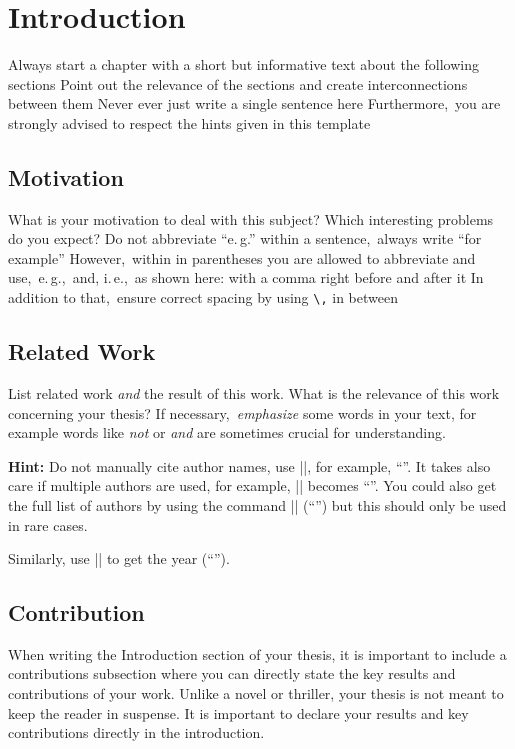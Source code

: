 \chapter{Introduction} \label{chap:intro}
Always start a chapter with a short but informative text about the following sections Point out the relevance of the sections and create interconnections between them Never ever just write a single sentence here Furthermore,\ you are strongly advised to respect the hints given in this template

\section{Motivation}
What is your motivation to deal with this subject? Which interesting problems do you expect? Do not abbreviate \enquote{e.\,g.\/} within a sentence,\ always write \enquote{for example} However,\ within in parentheses you are allowed to abbreviate and use,\ e.\,g.,\ and, i.\,e.,\ as shown here: with a comma right before and after it In addition to that,\ ensure correct spacing by using \texttt{\textbackslash,} in between

\section{Related Work}
List related work \emph{and} the result of this work. What is the relevance of this work concerning your thesis? If necessary,\ \emph{emphasize} some words in your text, for example words like \emph{not} or \emph{and} are sometimes crucial for understanding.

\textbf{Hint:} Do not manually cite author names, use \code|\citeauthor{Newsome:05:DTA}|, for example, \enquote{\citeauthor{Newsome:05:DTA}}.
It takes also care if multiple authors are used, for example, \code|\citeauthor{AviramSSHDSVAHD16}| becomes \enquote{\citeauthor{AviramSSHDSVAHD16}}.
You could also get the full list of authors by using the command \code|\citeauthor*{AviramSSHDSVAHD16}| (\enquote{\citeauthor*{AviramSSHDSVAHD16}}) but this should only be used in rare cases.

Similarly, use \code|\citeyear{Newsome:05:DTA}| to get the year (\enquote{\citeyear{Newsome:05:DTA}}).

\section{Contribution}

When writing the Introduction section of your thesis, it is important to include a contributions subsection where you can directly state the key results and contributions of your work. Unlike a novel or thriller, your thesis is not meant to keep the reader in suspense. It is important to declare your results and key contributions directly in the introduction.

